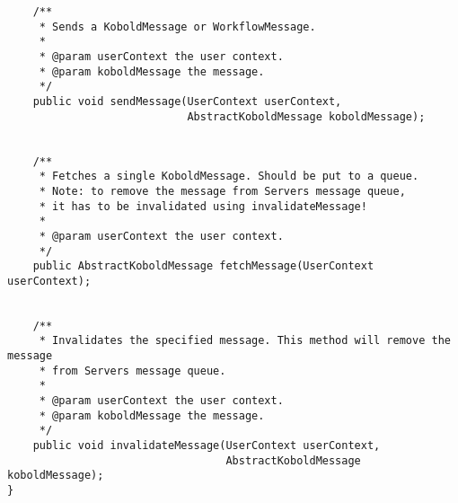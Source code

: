 \begin{verbatim}
	/**
	 * Sends a KoboldMessage or WorkflowMessage.
	 * 
	 * @param userContext the user context.
	 * @param koboldMessage the message.
	 */
	public void sendMessage(UserContext userContext,
							AbstractKoboldMessage koboldMessage);
	
	
	/**
	 * Fetches a single KoboldMessage. Should be put to a queue.
	 * Note: to remove the message from Servers message queue,
	 * it has to be invalidated using invalidateMessage!
	 * 
	 * @param userContext the user context.
	 */
	public AbstractKoboldMessage fetchMessage(UserContext userContext);
	

	/**
	 * Invalidates the specified message. This method will remove the message
	 * from Servers message queue.
	 * 
	 * @param userContext the user context.
	 * @param koboldMessage the message.
	 */
	public void invalidateMessage(UserContext userContext,
								  AbstractKoboldMessage koboldMessage);
}
\end{verbatim}
